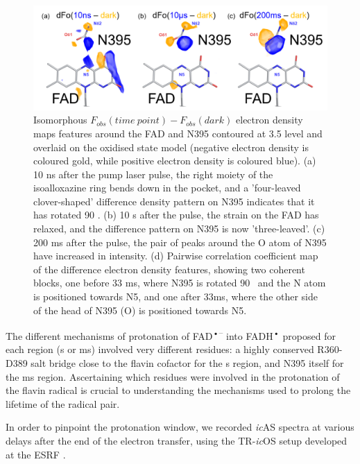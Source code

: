 \begin{figure}[H]
  \centering
  \includegraphics[width=\textwidth]{images/cracry/CraCRY_protonation.pdf}
  \hfill
  \caption{Isomorphous \(F_{obs}(time\ point) - F_{obs}(dark)\) electron density maps features around the FAD and N395 contoured at 3.5 \textsigma level and overlaid on the oxidised state model (negative electron density is coloured gold, while positive electron density is coloured blue). (a) 10 ns after the pump laser pulse, the right moiety of the isoalloxazine ring bends down in the pocket, and a 'four-leaved clover-shaped' difference density pattern on N395 indicates that it has rotated 90 \degree. (b) 10 \textmu s after the pulse, the strain on the FAD has relaxed, and the difference pattern on N395 is now 'three-leaved'. (c) 200 ms after the pulse, the pair of peaks around the O atom of N395 have increased in intensity. (d) Pairwise correlation coefficient map of the difference electron density features, showing two coherent blocks, one before 33 ms, where N395 is rotated 90 \degree\ and the N atom is positioned towards N5, and one after 33ms, where the other side of the head of N395 (O) is positioned towards N5.}\label{fig:CraCRY_protonation}
\end{figure}

The different mechanisms of protonation of FAD\textsuperscript{•–} into FADH\textsuperscript{•} proposed for each region (\textmu s or ms)  involved very different residues: a highly conserved R360-D389 salt bridge close to the flavin cofactor for the \textmu s region, and N395 itself for the ms region. Ascertaining which residues were involved in the protonation of the flavin radical is crucial to understanding the mechanisms used to prolong the lifetime of the radical pair. 

In order to pinpoint the protonation window, we recorded \textit{ic}AS spectra at various delays after the end of the electron transfer, using the TR-\textit{ic}OS setup developed at the ESRF \parencite{engilbergeTRicOSSetupESRF2024}.

